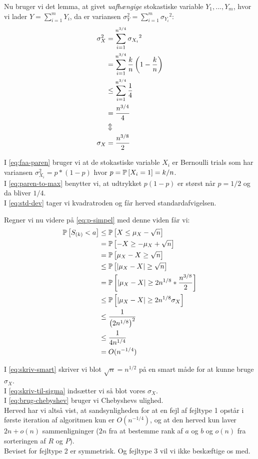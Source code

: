 Nu bruger vi det lemma, at givet \emph{uafhængige} stokastiske variable $Y_1, ..., Y_m$, hvor vi lader $Y = \sum_{i=1}^m Y_i$, da er variansen $\sigma_Y^2 = \sum_{i=1}^m {\sigma_{Y_i}}^2$:
\begin{align}
  \sigma_X^2 &= \sum_{i=1}^{n^{3/4}} {\sigma_{X_i}}^2 \nonumber \\
  &= \sum_{i=1}^{n^{3/4}} \frac{k}{n} \p{ 1 - \frac{k}{n} } \label{eq:faa-paren} \\
  &\leq \sum_{i=1}^{n^{3/4}} \frac{1}{4} \label{eq:paren-to-max} \\
  &= \frac{n^{3/4}}{4} \nonumber \\
  &\Updownarrow \nonumber \\
  \sigma_X &= \frac{n^{3/8}}{2} \label{eq:std-dev}
\end{align}

I \cref{eq:faa-paren} bruger vi at de stokastiske variable $X_i$ er Bernoulli trials som har variansen $\sigma_{X_i}^2 = p*(1-p)$ hvor $p = \P{X_i = 1} = k/n$.\\
I \cref{eq:paren-to-max} benytter vi, at udtrykket $p(1 - p)$ er størst når $p = 1/2$ og da bliver $1/4$.\\
I \cref{eq:std-dev} tager vi kvadratroden og får herved standardafvigelsen.

Regner vi nu videre på \cref{eq:p-simpel} med denne viden får vi:
\begin{align}
  \P{S_{(k)} < a} &\leq \P{X \leq \mu_X - \sqrt{n}} \nonumber \\
  &= \P{-X \geq -\mu_X + \sqrt{n}} \nonumber \\
  &= \P{\mu_X - X \geq \sqrt{n}} \nonumber \\
  &\leq \P{|\mu_X - X| \geq \sqrt{n}}  \nonumber \\
  &= \P{|\mu_X - X| \geq 2n^{1/8} * \frac{n^{3/8}}{2}  } \label{eq:skriv-smart} \\
  &\leq \P{ |\mu_X - X| \geq 2n^{1/8} \sigma_X } \label{eq:skriv-til-sigma} \\
  &\leq \frac{1}{\p{2n^{1/8}}^2} \label{eq:brug-chebyshev} \\
  &\leq \frac{1}{4n^{1/4}} \nonumber \\
  &= O(n^{-1/4}) \nonumber
\end{align}

I \cref{eq:skriv-smart} skriver vi blot $\sqrt{n} = n^{1/2}$ på en smart måde for at kunne bruge $\sigma_X$.\\
I \cref{eq:skriv-til-sigma} indsætter vi så blot vores $\sigma_X$.\\
I \cref{eq:brug-chebyshev} bruger vi Chebyshevs ulighed.\\

Herved har vi altså vist, at sandsynligheden for at en fejl af fejltype 1 opstår i første iteration af algoritmen kun er $O(n^{-1/4})$, og at den herved kun laver $2n + o(n)$ sammenligninger ($2n$ fra at bestemme rank af $a$ og $b$ og $o(n)$ fra sorteringen af $R$ og $P$).\\

Beviset for fejltype 2 er symmetrisk. Og fejltype 3 vil vi ikke beskæftige os med.
